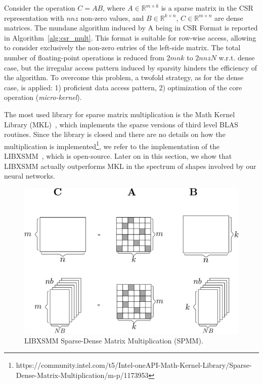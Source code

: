 Consider the operation $C = AB$, where $A \in \mathbb{R}^{m \times k}$ is a sparse matrix in the CSR representation with $nnz$ non-zero values, and $B \in \mathbb{R}^{k \times n}$, $C \in \mathbb{R}^{m \times n}$ are dense matrices. 
The mundane algorithm induced by A being in CSR Format is reported in Algorithm~\ref{alg:csr_mult}. This format is suitable for row-wise access, allowing to consider exclusively the non-zero entries of the left-side matrix. 
The total number of floating-point operations is reduced from $2mnk$ to $2 nnz N$ w.r.t. dense case, but the irregular access pattern induced by sparsity hinders the efficiency of the algorithm. To overcome this problem, a twofold strategy, as for the dense case, is applied: 1) proficient data access pattern, 2) optimization of the core operation (\textit{micro-kernel}). 

The most used library for sparse matrix multiplication is the Math Kernel Library (MKL)~\cite{wang2014intel}, which implements the sparse versions of third level BLAS routines. Since the library is closed and there are no details on how the multiplication is implemented\footnote{https://community.intel.com/t5/Intel-oneAPI-Math-Kernel-Library/Sparse-Dense-Matrix-Multiplication/m-p/1173953}, we refer to the implementation of the LIBXSMM~\cite{heinecke2016libxsmm}, which is open-source. Later on in this section, we show that LIBXSMM actually outperforms MKL in the spectrum of shapes involved by our neural networks. 

\begin{figure}
\centering
	\includegraphics[width=\columnwidth]{imgs/libxsmm_sparse_dense_mult.pdf}
	\caption{LIBXSMM Sparse-Dense Matrix Multiplication (SPMM).}
	\label{fig:libxsmmsparsedense}
\end{figure}

